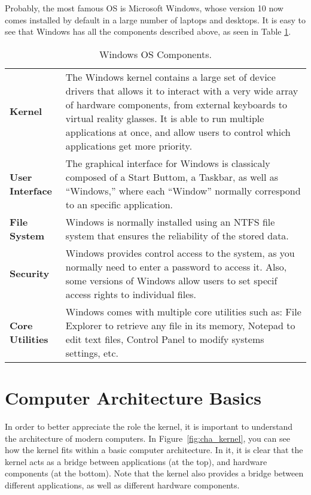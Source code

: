 Probably, the most famous \acs{OS} is Microsoft Windows, whose version 10 now comes installed by default in a large number of laptops and desktops. It is easy to see that Windows has all the components described above, as seen in Table \ref{tab:windows_os}.

\begin{table}[!htbp]
   \myfloatalign
   \begin{tabularx}{\textwidth}{Xp{85mm}} \toprule
   \textbf{Kernel} & The Windows kernel contains a large set of device drivers that allows it to interact with a very wide array of hardware components, from external keyboards to virtual reality glasses. It is able to run multiple applications at once, and allow users to control which applications get more priority. \\
   \textbf{User Interface} &  The graphical interface for Windows is classicaly composed of a Start Buttom, a Taskbar, as well as ``Windows,'' where each ``Window'' normally correspond to an specific application. \\
   \textbf{File System} & Windows is normally installed using an NTFS file system that ensures the reliability of the stored data.\\
   \textbf{Security} & Windows provides control access to the system, as you normally need to enter a password to access it. Also, some versions of Windows allow users to set specif access rights to individual files.\\
   \textbf{Core Utilities} & Windows comes with multiple core utilities such as: File Explorer to retrieve any file in its memory, Notepad to edit text files, Control Panel to modify systems settings, etc.\\

\bottomrule
   \end{tabularx}
\caption{Windows \acs{OS} Components.}
\label{tab:windows_os}
\end{table}

\section{Computer Architecture Basics}

In order to better appreciate the role the kernel, it is important to understand the architecture of modern computers. In Figure~\ref{fig:cha_kernel}, you can see how the kernel fits within a basic computer architecture. In it, it is clear that the kernel acts as a bridge between applications (at the top), and hardware components (at the bottom). Note that the kernel also provides a bridge between different applications, as well as different hardware components.

